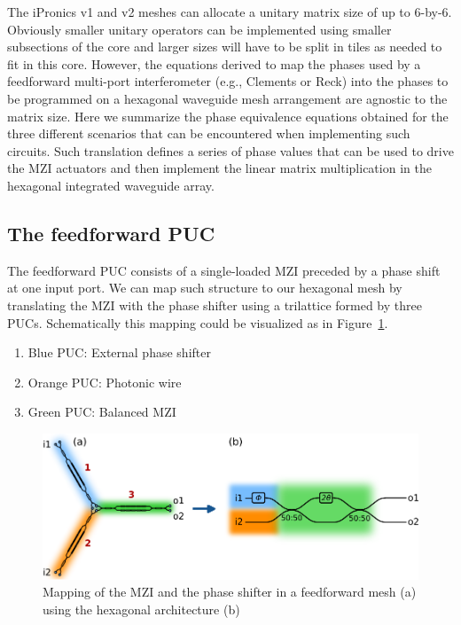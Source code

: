 The iPronics v1 and v2 meshes can allocate a unitary matrix size of up to 6-by-6.
Obviously smaller unitary operators can be implemented using smaller subsections of the core and larger sizes will have to be split in tiles as needed to fit in this core.
However, the equations derived to map the phases used by a feedforward multi-port interferometer (e.g., Clements or Reck) into the phases to be programmed on a hexagonal waveguide mesh arrangement are agnostic to the matrix size.
Here we summarize the phase equivalence equations obtained for the three different scenarios that can be encountered when implementing such circuits.
Such translation defines a series of phase values that can be used to drive the MZI actuators and then implement the linear matrix multiplication in the hexagonal integrated waveguide array.

\subsection{The feedforward PUC}\label{sub:the_feedforward_puc} %

The feedforward PUC consists of a single-loaded MZI preceded by a phase shift at one input port.
We can map such structure to our hexagonal mesh by translating the MZI with the phase shifter using a trilattice formed by three PUCs.
Schematically this mapping could be visualized as in Figure~\ref{fig:ch4-mapping_trilattice}.
\begin{enumerate}
	\item Blue PUC: External phase shifter
	\item Orange PUC: Photonic wire
	\item Green PUC: Balanced MZI
\end{enumerate}

\begin{figure}[h!]
	\begin{center}
		\includegraphics{figures/ch4-mapping_trilattice.pdf}
	\end{center}
	\caption{Mapping of the MZI and the phase shifter in a feedforward mesh (a) using the hexagonal
		architecture (b)}\label{fig:ch4-mapping_trilattice}
\end{figure}

